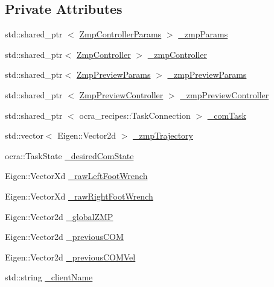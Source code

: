 \subsection*{\-Private \-Attributes}
\begin{DoxyCompactItemize}
\item 
std\-::shared\-\_\-ptr\*
$<$ \hyperlink{structZmpControllerParams}{\-Zmp\-Controller\-Params} $>$ \hyperlink{classWalkingClient_a20012b4bee7f6de8177ed53907f894cb}{\-\_\-zmp\-Params}
\item 
std\-::shared\-\_\-ptr$<$ \hyperlink{classZmpController}{\-Zmp\-Controller} $>$ \hyperlink{classWalkingClient_afc6a0ac97a4c3f83e27879e803fab8f6}{\-\_\-zmp\-Controller}
\item 
std\-::shared\-\_\-ptr$<$ \hyperlink{structZmpPreviewParams}{\-Zmp\-Preview\-Params} $>$ \hyperlink{classWalkingClient_a9a2cf2d6107ab91fc5bd1d82a3b85a84}{\-\_\-zmp\-Preview\-Params}
\item 
std\-::shared\-\_\-ptr\*
$<$ \hyperlink{classZmpPreviewController}{\-Zmp\-Preview\-Controller} $>$ \hyperlink{classWalkingClient_ae570aa07bed9e336eda93f331f3485fb}{\-\_\-zmp\-Preview\-Controller}
\item 
std\-::shared\-\_\-ptr\*
$<$ ocra\-\_\-recipes\-::\-Task\-Connection $>$ \hyperlink{classWalkingClient_aa798d6193535e80816f8107ee5fb2172}{\-\_\-com\-Task}
\item 
std\-::vector$<$ \-Eigen\-::\-Vector2d $>$ \hyperlink{classWalkingClient_a8b8a3d7fe6e12d49a0e72d05f9938564}{\-\_\-zmp\-Trajectory}
\item 
ocra\-::\-Task\-State \hyperlink{classWalkingClient_a2625bf687aa3141f5a2404c8d9b3c392}{\-\_\-desired\-Com\-State}
\item 
\-Eigen\-::\-Vector\-Xd \hyperlink{classWalkingClient_a1c3fb4d182e33d6d9386e9bb05aa4ae8}{\-\_\-raw\-Left\-Foot\-Wrench}
\item 
\-Eigen\-::\-Vector\-Xd \hyperlink{classWalkingClient_a9df32e0c73632c5f869e5933e20def71}{\-\_\-raw\-Right\-Foot\-Wrench}
\item 
\-Eigen\-::\-Vector2d \hyperlink{classWalkingClient_aa784eac1247f0d858e2364e0c2bc25b2}{\-\_\-global\-Z\-M\-P}
\item 
\-Eigen\-::\-Vector2d \hyperlink{classWalkingClient_a549751e511e023d5fc73eccd1c185317}{\-\_\-previous\-C\-O\-M}
\item 
\-Eigen\-::\-Vector2d \hyperlink{classWalkingClient_aa0c7669193a8a42ed289c79523580033}{\-\_\-previous\-C\-O\-M\-Vel}
\item 
std\-::string \hyperlink{classWalkingClient_aff02b341d5e1f500dc9a849337319a8d}{\-\_\-client\-Name}

\end{DoxyCompactItemize}
